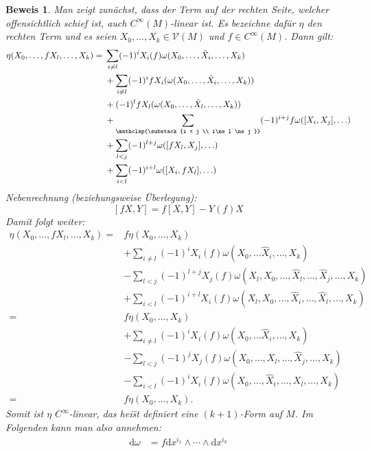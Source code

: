 \documentclass[paper=A4, twoside, chapterprefix=true, bibliography=totoc, headsepline]{scrbook}
\newcommand{\dop}{\mathrm{d}}
\theoremstyle{plain}
\theoremstyle{nonumberplain}
\newtheorem{bew}{Beweis}
\theoremstyle{empty}
\theoremstyle{break}
\begin{document}
\begin{bew}
Man zeigt zun\"achst, dass der Term auf der rechten Seite, welcher offensichtlich schief ist, auch $C^{\infty}(M)$-linear ist.
Es bezeichne daf\"ur $\eta$ den rechten Term und es seien $X_0, \ldots, X_k \in \mathcal V(M)$ und $f \in C^{\infty}(M)$. Dann gilt:
\begin{align*}
    \eta(X_0,\ldots,fX_l,\ldots, X_k) ={} & \sum_{i \neq l}(-1)^iX_i(f) \omega(X_0,\ldots, \hat X_i, \ldots, X_k)\\
& + \sum_{i \neq l}(-1)^ifX_i(\omega(X_0,\ldots, \hat X_i, \ldots, X_k))\\
& + (-1)^lfX_l(\omega(X_0, \ldots, \hat X_l, \ldots, X_k))\\ %
& + \sum_{\mathclap{\substack{i < j \\ i\ne l \ne j }}}(-1)^{i+j}f\omega([X_i,X_j], \ldots )\\ %
& + \sum_{l < j}(-1)^{l+j}\omega([fX_l,X_j], \ldots )\\
& + \sum_{i<l}(-1)^{i+l}\omega([X_i,fX_l], \ldots )
  \end{align*}
Nebenrechnung (beziehungsweise \"Uberlegung):
	\[ [fX, Y] = f[X,Y] - Y(f)X \]
Damit folgt weiter:
\begin{align*}
	\eta(X_0,\ldots,fX_l,\ldots, X_k) ={} & f \eta(X_0,\ldots, X_k) \\
		& + \sum_{i\neq l} (-1)^i X_i(f)\omega(X_0, \ldots \hat X_i, \ldots, X_k)\\
		& - \sum_{l<j}(-1)^{l+j}X_j(f) \omega(X_l, X_0, \ldots, \hat X_l, \ldots, \hat X_j, \ldots, X_k)\\
		& + \sum_{i<l}(-1)^{i+l}X_i(f) \omega(X_l, X_0, \ldots, \hat X_i, \ldots, \hat X_l, \ldots, X_k)\\
	={} & f \eta(X_0,\ldots, X_k) \\
		& + \sum_{i\neq l} (-1)^i X_i(f)\omega(X_0, \ldots \hat X_i, \ldots, X_k)\\
		& - \sum_{l<j}(-1)^{j}X_j(f) \omega(X_0, \ldots, X_l, \ldots, \hat X_j, \ldots, X_k)\\
		& - \sum_{i<l}(-1)^{i}X_i(f) \omega(X_0, \ldots, \hat X_i, \ldots, X_l, \ldots, X_k)\\
	={} & f \eta(X_0,\ldots, X_k).
\end{align*}
Somit ist $\eta$ $C^{\infty}$-linear, das hei\"st definiert eine $(k+1)$-Form auf $M$.
Im Folgenden kann man also annehmen:
\begin{align*}
	\dop \omega &= f \dop x^{i_1} \wedge \cdots \wedge \dop x^{i_k}\\

\end{align*}
\end{bew}
\end{document}
